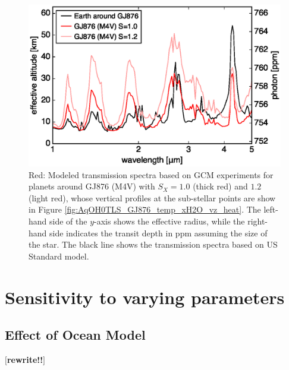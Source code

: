 \documentclass[11pt,numberedappendix,twocolappendix,]{emulateapj}
\def\memo#1{\color{red}$[${\bf #1}$]$ \color{black}}
\begin{document}
\begin{figure}[!h]
    \begin{center}
    \includegraphics[width=\hsize]{fig/transmission.eps}
    \end{center}
\caption{Red: Modeled transmission spectra based on GCM experiments for planets around GJ876 (M4V) with $S_X=1.0$ (thick red) and $1.2$ (light red), whose vertical profiles at the sub-stellar points are show in Figure \ref{fig:AqOH0TLS_GJ876_temp_xH2O_vz_heat}. The left-hand side of the $y$-axis shows the effective radius, while the right-hand side indicates the transit depth in ppm assuming the size of the star. The black line shows the transmission spectra based on US Standard model. }
\label{fig:transmission}
\end{figure}


\section{Sensitivity to varying parameters}
\label{s:sensitivity}

\subsection{Effect of Ocean Model}
\label{ss:sensitivity_ocean}

\memo{rewrite!!}
\end{document}
